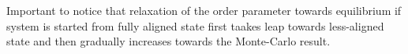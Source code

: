 Important to notice that relaxation of the order parameter towards equilibrium if system is started from fully aligned state first taakes leap towards less-aligned state and then gradually increases towards the Monte-Carlo result.

%
